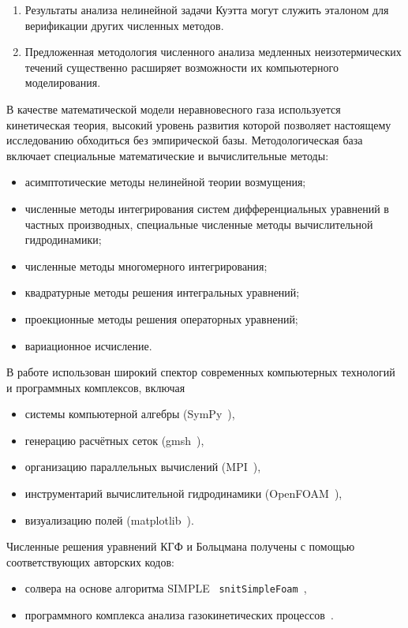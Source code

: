 {\influence}
\begin{enumerate}
    \item Результаты анализа нелинейной задачи Куэтта могут служить эталоном
    для верификации других численных методов.
    \item Предложенная методология численного анализа медленных неизотермических течений
    существенно расширяет возможности их компьютерного моделирования.
\end{enumerate}

{\methods}
В качестве математической модели неравновесного газа используется кинетическая теория,
высокий уровень развития которой позволяет настоящему исследованию обходиться без эмпирической базы.
Методологическая база включает специальные математические и вычислительные методы:
\begin{itemize}
    \item асимптотические методы нелинейной теории возмущения;
    \item численные методы интегрирования систем дифференциальных уравнений в частных производных,
    специальные численные методы вычислительной гидродинамики;
    \item численные методы многомерного интегрирования;
    \item квадратурные методы решения интегральных уравнений;
    \item проекционные методы решения операторных уравнений;
    \item вариационное исчисление.
\end{itemize}
В работе использован широкий спектор современных компьютерных технологий и программных комплексов, включая
\begin{itemize}
    \item системы компьютерной алгебры (SymPy~\autocite{sympy}),
    \item генерацию расчётных сеток (gmsh~\autocite{gmsh}),
    \item организацию параллельных вычислений (MPI~\autocite{mpi}),
    \item инструментарий вычислительной гидродинамики (OpenFOAM~\autocite{openfoam}),
    \item визуализацию полей (matplotlib~\autocite{matplotlib}).
\end{itemize}
Численные решения уравнений КГФ и Больцмана получены с помощью соответствующих авторских кодов:
\begin{itemize}
    \item солвера на основе алгоритма SIMPLE~\autocite{SIMPLE}
    \verb+snitSimpleFoam+~\cite{Rogozin2014},
    \item программного комплекса анализа газокинетических процессов~\cite{Rogozin2010, Rogozin2011}.
\end{itemize}

